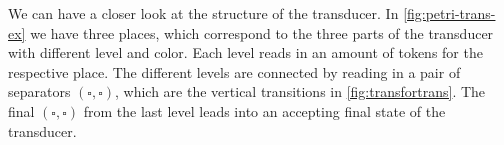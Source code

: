 %    	
%            	

We can have a closer look at the structure of the transducer. In \autoref{fig:petri-trans-ex} we have three places, which correspond to the three parts of the transducer with different level and color. Each level reads in an amount of tokens for the respective place. The different levels are connected by reading in a pair of separators $(\square,\square)$, which are the vertical transitions in \autoref{fig:transfortrans}. The final $(\square,\square)$ from the last level leads into an accepting final state of the transducer.


